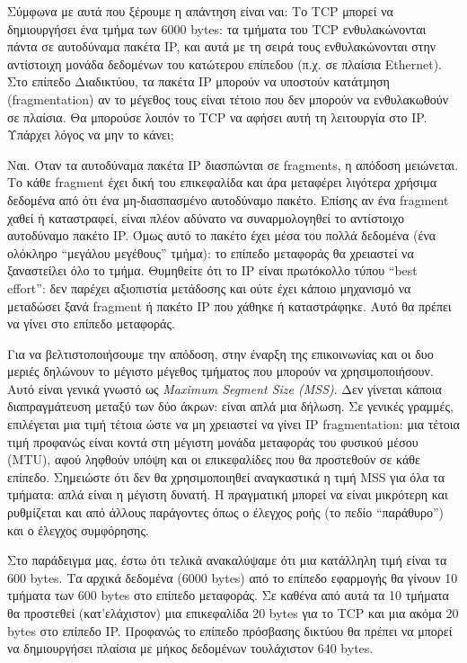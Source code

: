 Σύμφωνα με αυτά που ξέρουμε η απάντηση είναι ναι: Το TCP μπορεί να δημιουργήσει ένα τμήμα των 6000 bytes: τα τμήματα του TCP ενθυλακώνονται πάντα σε αυτοδύναμα πακέτα IP, και αυτά με τη σειρά τους ενθυλακώνονται στην αντίστοιχη μονάδα δεδομένων του κατώτερου επίπεδου (π.χ. σε πλαίσια Ethernet). Στο επίπεδο Διαδικτύου, τα πακέτα IP μπορούν να υποστούν κατάτμηση (fragmentation) αν το μέγεθος τους είναι τέτοιο που δεν μπορούν να ενθυλακωθούν σε πλαίσια. Θα μπορούσε λοιπόν το TCP να αφήσει αυτή τη λειτουργία στο IP. Υπάρχει λόγος να μην το κάνει;

Ναι. Όταν τα αυτοδύναμα πακέτα IP διασπώνται σε fragments, η απόδοση μειώνεται. Το κάθε fragment έχει δική του επικεφαλίδα και άρα μεταφέρει λιγότερα χρήσιμα δεδομένα από ότι ένα μη-διασπασμένο αυτοδύναμο πακέτο. Επίσης αν ένα fragment χαθεί ή καταστραφεί, είναι πλέον αδύνατο να συναρμολογηθεί το αντίστοιχο αυτοδύναμο πακέτο IP. Όμως αυτό το πακέτο έχει μέσα του πολλά δεδομένα (ένα ολόκληρο ``μεγάλου μεγέθους'' τμήμα): το επίπεδο μεταφοράς θα χρειαστεί να ξαναστείλει όλο το τμήμα. Θυμηθείτε ότι το IP είναι πρωτόκολλο τύπου ``best effort'': δεν παρέχει αξιοπιστία μετάδοσης και ούτε έχει κάποιο μηχανισμό να μεταδώσει ξανά fragment ή πακέτο IP που χάθηκε ή καταστράφηκε. Αυτό θα πρέπει να γίνει στο επίπεδο μεταφοράς.

Για να βελτιστοποιήσουμε την απόδοση, στην έναρξη της επικοινωνίας και οι δυο μεριές δηλώνουν το μέγιστο μέγεθος τμήματος που μπορούν να χρησιμοποιήσουν. Αυτό είναι γενικά γνωστό ως \emph{Maximum Segment Size (MSS)}. Δεν γίνεται κάποια διαπραγμάτευση μεταξύ των δύο άκρων: είναι απλά μια δήλωση. Σε γενικές γραμμές, επιλέγεται μια τιμή τέτοια ώστε να μη χρειαστεί να γίνει IP fragmentation: μια τέτοια τιμή προφανώς είναι κοντά στη μέγιστη μονάδα μεταφοράς του φυσικού μέσου (MTU), αφού ληφθούν υπόψη και οι επικεφαλίδες που θα προστεθούν σε κάθε επίπεδο. Σημειώστε ότι δεν θα χρησιμοποιηθεί αναγκαστικά η τιμή MSS για όλα τα τμήματα: απλά είναι η μέγιστη δυνατή. Η πραγματική μπορεί να είναι μικρότερη και ρυθμίζεται και από άλλους παράγοντες όπως ο έλεγχος ροής (το πεδίο ``παράθυρο'') και ο έλεγχος συμφόρησης.

Στο παράδειγμα μας, έστω ότι τελικά ανακαλύψαμε ότι μια κατάλληλη τιμή είναι τα 600 bytes. Τα αρχικά δεδομένα (6000 bytes) από το επίπεδο εφαρμογής θα γίνουν 10 τμήματα των 600 bytes στο επίπεδο μεταφοράς. Σε καθένα από αυτά τα 10 τμήματα θα προστεθεί (κατ'ελάχιστον) μια επικεφαλίδα 20 bytes για το TCP και μια ακόμα 20 bytes στο επίπεδο IP. Προφανώς το επίπεδο πρόσβασης δικτύου θα πρέπει να μπορεί να δημιουργήσει πλαίσια με μήκος δεδομένων τουλάχιστον 640 bytes.

